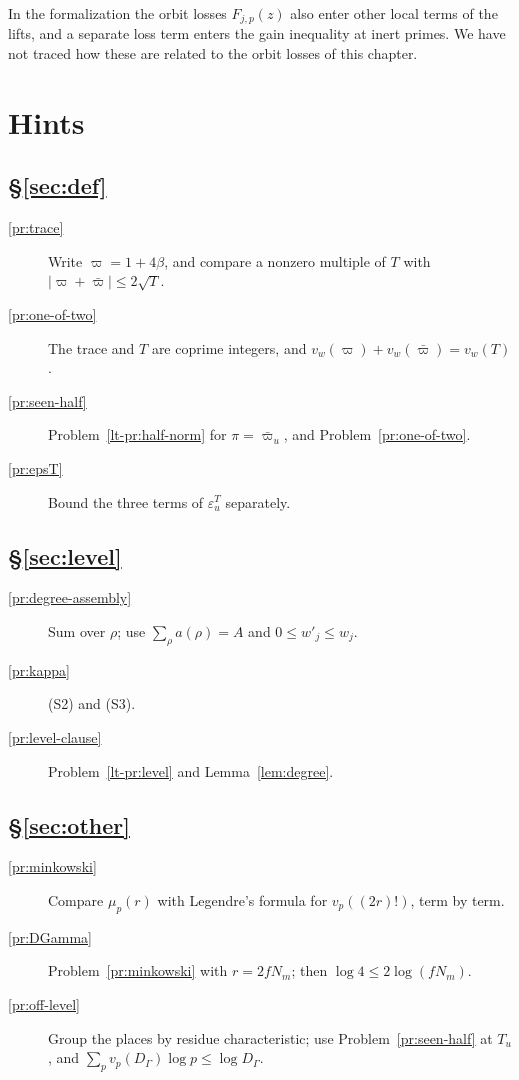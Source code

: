 \documentclass[reqno]{amsart}
\newcounter{chap}
\theoremstyle{definition}
\theoremstyle{plain}
\theoremstyle{remark}
\begin{document}
In the formalization the orbit losses \(F_{j,p}(z)\) also enter other local terms of the lifts, and a separate loss term enters the gain inequality at inert primes.  We have not traced how these are related to the orbit losses of this chapter.

\section*{Hints}

\subsection*{\S\ref{sec:def}}
\begin{description}
\item[\ref{pr:trace}] Write \(\varpi=1+4\beta\), and compare a nonzero multiple of \(T\) with \(\lvert\varpi+\bar\varpi\rvert\le2\sqrt T\).
\item[\ref{pr:one-of-two}] The trace and \(T\) are coprime integers, and \(v_w(\varpi)+v_w(\bar\varpi)=v_w(T)\).
\item[\ref{pr:seen-half}] Problem~\ref{lt-pr:half-norm} for \(\pi=\bar\varpi_u\), and Problem~\ref{pr:one-of-two}.
\item[\ref{pr:epsT}] Bound the three terms of \(\varepsilon^T_u\) separately.
\end{description}

\subsection*{\S\ref{sec:level}}
\begin{description}
\item[\ref{pr:degree-assembly}] Sum over \(\rho\); use \(\sum_\rho a(\rho)=A\) and \(0\le w'_j\le w_j\).
\item[\ref{pr:kappa}] (S2) and (S3).
\item[\ref{pr:level-clause}] Problem~\ref{lt-pr:level} and Lemma~\ref{lem:degree}.
\end{description}

\subsection*{\S\ref{sec:other}}
\begin{description}
\item[\ref{pr:minkowski}] Compare \(\mu_p(r)\) with Legendre's formula for \(v_p((2r)!)\), term by term.
\item[\ref{pr:DGamma}] Problem~\ref{pr:minkowski} with \(r=2fN_m\); then \(\log 4\le2\log(fN_m)\).
\item[\ref{pr:off-level}] Group the places by residue characteristic; use Problem~\ref{pr:seen-half} at \(T_u\), and \(\sum_{p}v_p(D_\Gamma)\log p\le\log D_\Gamma\).
\end{description}
\end{document}
